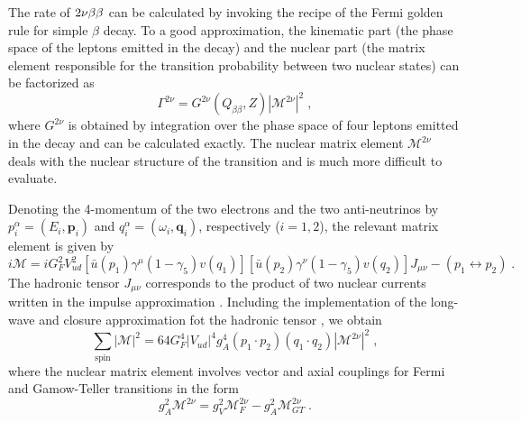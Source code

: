  The rate of $2\nu\beta\beta$ can be calculated by invoking the recipe of the Fermi golden rule for simple $\beta$ decay. To a good approximation, the kinematic part (the phase space of the leptons emitted in the decay) and the nuclear part (the matrix element responsible for the transition probability between two nuclear states) can be factorized as
\begin{equation}\Gamma^{2\nu}=G^{2\nu}(Q_{\beta\beta},Z)|\mathcal{M}^{2\nu}|^2\;,\end{equation}
where $G^{2\nu}$ is obtained by integration over the phase space of four leptons emitted in the decay and can be calculated exactly. The nuclear matrix element $\mathcal{M}^{2\nu}$ deals with the nuclear structure of the transition and is much more difficult to evaluate.

Denoting the 4-momentum of the two electrons and the two anti-neutrinos by $p^\alpha_i=(E_i,\mathbf{p}_i)$ and $q^\alpha_i=(\omega_i,\mathbf{q}_i)$, respectively ($i=1,2$), the relevant matrix element is given by
\begin{equation}i\mathcal{M}=iG^2_FV^2_{ud}[\bar{u}(p_1)\gamma^\mu(1-\gamma_5)v(q_1)][\bar{u}(p_2)\gamma^\nu(1-\gamma_5)v(q_2)]J_{\mu\nu}-(p_1\leftrightarrow p_2)\;.\end{equation}
The hadronic tensor $J_{\mu\nu}$ corresponds to the product of two nuclear currents written in the impulse approximation \cite{Tomoda:1991}. Including the implementation of the long-wave and closure approximation fot the hadronic tensor \cite{Tomoda:1991}, we obtain
\begin{equation}\sum_\text{spin}|\mathcal{M}|^2=64G^4_F|V_{ud}|^4g^4_A(p_1\cdot p_2)(q_1\cdot q_2)|\mathcal{M}^{2\nu}|^2\;,\end{equation}
where the nuclear matrix element involves vector and axial couplings for Fermi and Gamow-Teller transitions in the form
\begin{equation}g^2_A\mathcal{M}^{2\nu}=g^2_V\mathcal{M}^{2\nu}_F-g^2_A\mathcal{M}^{2\nu}_{GT}\;.\end{equation}


